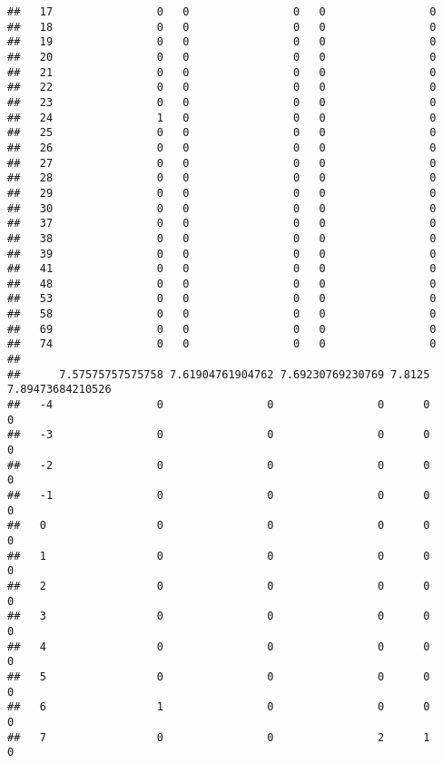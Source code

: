 \documentclass[]{article}
\begin{document}
\begin{verbatim}
##   17                0   0                0   0                0
##   18                0   0                0   0                0
##   19                0   0                0   0                0
##   20                0   0                0   0                0
##   21                0   0                0   0                0
##   22                0   0                0   0                0
##   23                0   0                0   0                0
##   24                1   0                0   0                0
##   25                0   0                0   0                0
##   26                0   0                0   0                0
##   27                0   0                0   0                0
##   28                0   0                0   0                0
##   29                0   0                0   0                0
##   30                0   0                0   0                0
##   37                0   0                0   0                0
##   38                0   0                0   0                0
##   39                0   0                0   0                0
##   41                0   0                0   0                0
##   48                0   0                0   0                0
##   53                0   0                0   0                0
##   58                0   0                0   0                0
##   69                0   0                0   0                0
##   74                0   0                0   0                0
##     
##      7.57575757575758 7.61904761904762 7.69230769230769 7.8125 7.89473684210526
##   -4                0                0                0      0                0
##   -3                0                0                0      0                0
##   -2                0                0                0      0                0
##   -1                0                0                0      0                0
##   0                 0                0                0      0                0
##   1                 0                0                0      0                0
##   2                 0                0                0      0                0
##   3                 0                0                0      0                0
##   4                 0                0                0      0                0
##   5                 0                0                0      0                0
##   6                 1                0                0      0                0
##   7                 0                0                2      1                0

\end{verbatim}
\end{document}
